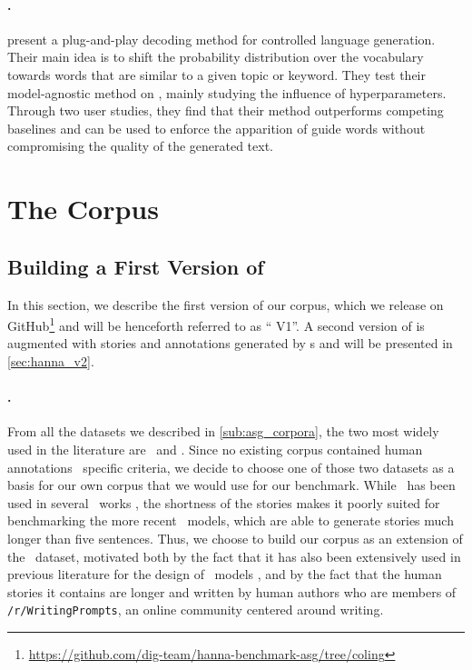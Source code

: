 \paragraph{\ktt.}
\citet{pascual-etal-2021-plug-play} present a plug-and-play decoding method for controlled language generation. Their main idea is to shift the probability distribution over the vocabulary towards words that are similar to a given topic or keyword. They test their model-agnostic method on {\gptt}, mainly studying the influence of hyperparameters. Through two user studies, they find that their method outperforms competing baselines and can be used to enforce the apparition of guide words without compromising the quality of the generated text.

\section{The {\hanna} Corpus}
\label{sec:hanna}

\subsection{Building a First Version of {\hanna}}
\label{sub:hanna_v1}

In this section, we describe the first version of our {\hanna} corpus, which we release on GitHub\footnote{\url{https://github.com/dig-team/hanna-benchmark-asg/tree/coling}} and will be henceforth referred to as ``{\hanna} V1''. A second version of {\hanna} is augmented with stories and annotations generated by {\llm}s and will be presented in \autoref{sec:hanna_v2}.

\paragraph{\wpfan.}
From all the datasets we described in \autoref{sub:asg_corpora}, the two most widely used in the literature are \roc\ and \wpfan. Since no existing corpus contained human annotations \wrt\ specific criteria, we decide to choose one of those two datasets as a basis for our own corpus that we would use for our benchmark. While \roc\ has been used in several \asg\ works \citep{peng-etal-2018-towards, yao2019plan, mao-etal-2019-improving, brahman-etal-2020-cue, guan-etal-2020-knowledge, jhamtani-berg-kirkpatrick-2020-narrative, guan2021long, pascual-etal-2021-plug-play}, the shortness of the stories makes it poorly suited for benchmarking the more recent \asg\ models, which are able to generate stories much longer than five sentences. Thus, we choose to build our corpus as an extension of the \wpfan\ dataset, motivated both by the fact that it has also been extensively used in previous literature for the design of \asg\ models \citep{mao-etal-2019-improving, rashkin-etal-2020-plotmachines, goldfarb-tarrant-etal-2020-content, fang2021transformer, guan2021long, bai2021semantics, wilmot2021temporal}, and by the fact that the human stories it contains are longer and written by human authors who are members of \texttt{/r/WritingPrompts}, an online community centered around writing. 

